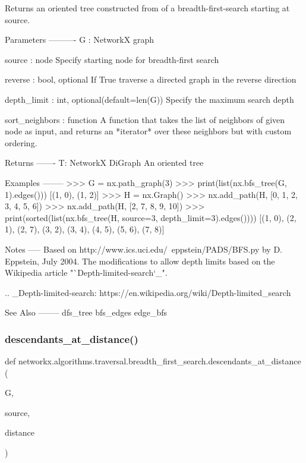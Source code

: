 \begin{DoxyVerb}Returns an oriented tree constructed from of a breadth-first-search
starting at source.

Parameters
----------
G : NetworkX graph

source : node
   Specify starting node for breadth-first search

reverse : bool, optional
   If True traverse a directed graph in the reverse direction

depth_limit : int, optional(default=len(G))
    Specify the maximum search depth

sort_neighbors : function
    A function that takes the list of neighbors of given node as input, and
    returns an *iterator* over these neighbors but with custom ordering.

Returns
-------
T: NetworkX DiGraph
   An oriented tree

Examples
--------
>>> G = nx.path_graph(3)
>>> print(list(nx.bfs_tree(G, 1).edges()))
[(1, 0), (1, 2)]
>>> H = nx.Graph()
>>> nx.add_path(H, [0, 1, 2, 3, 4, 5, 6])
>>> nx.add_path(H, [2, 7, 8, 9, 10])
>>> print(sorted(list(nx.bfs_tree(H, source=3, depth_limit=3).edges())))
[(1, 0), (2, 1), (2, 7), (3, 2), (3, 4), (4, 5), (5, 6), (7, 8)]


Notes
-----
Based on http://www.ics.uci.edu/~eppstein/PADS/BFS.py
by D. Eppstein, July 2004. The modifications
to allow depth limits based on the Wikipedia article
"`Depth-limited-search`_".

.. _Depth-limited-search: https://en.wikipedia.org/wiki/Depth-limited_search

See Also
--------
dfs_tree
bfs_edges
edge_bfs
\end{DoxyVerb}
 \mbox{\label{namespacenetworkx_1_1algorithms_1_1traversal_1_1breadth__first__search_a4f27fb79b259e1555e260dcc1df85743}} 
\subsubsection{\texorpdfstring{descendants\+\_\+at\+\_\+distance()}{descendants\_at\_distance()}}
{\footnotesize\ttfamily def networkx.\+algorithms.\+traversal.\+breadth\+\_\+first\+\_\+search.\+descendants\+\_\+at\+\_\+distance (\begin{DoxyParamCaption}\item[{}]{G,  }\item[{}]{source,  }\item[{}]{distance }\end{DoxyParamCaption})}

